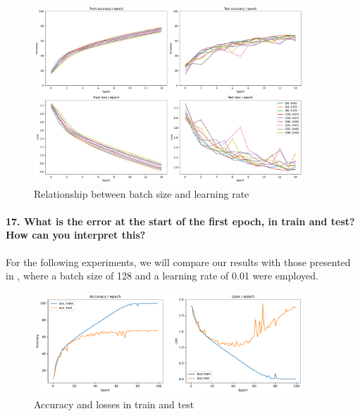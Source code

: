 \begin{figure}[H]
    \centering
    \includegraphics*[width=0.9\textwidth]{figs/CNN/linear_scaling.pdf}
    \caption{Relationship between batch size and learning rate}
    \label{fig:linear_scaling}
\end{figure}

\paragraph{17. What is the error at the start of the first epoch, in train and test? How can you interpret this?}

For the following experiments, we will compare our results with those presented in , where a batch size of 128 and a learning rate of 0.01 were employed.

\begin{figure}[H]
    \centering
    \includegraphics*[width=0.9\textwidth]{figs/CNN/base_result.pdf}
    \caption{Accuracy and losses in train and test}
    \label{fig:base_result}
\end{figure}


